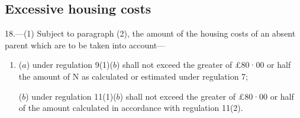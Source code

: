 \documentclass[12pt,a4paper]{article}
\begin{document}

%
%
%
%
%


\subsection[18. Excessive housing costs]{Excessive housing costs}

18.—(1) Subject to paragraph (2), the amount of the housing costs of an absent parent which are to be taken into account—
\begin{enumerate}\item[]
($a$) under regulation 9(1)($b$) shall not exceed the greater of £80·00 or half the amount of N as calculated or estimated under regulation 7;

($b$) under regulation 11(1)($b$) shall not exceed the greater of £80·00 or half of the amount calculated in accordance with regulation 11(2).
\end{enumerate}
\end{document}
